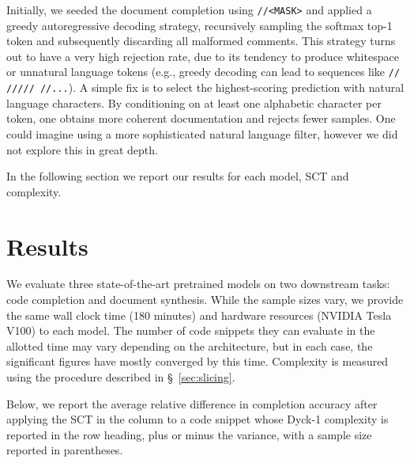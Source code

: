 \documentclass[sigconf,review,anonymous]{acmart}
\begin{document}
  Initially, we seeded the document completion using \texttt{//<MASK>} and applied a greedy autoregressive decoding strategy, recursively sampling the softmax top-1 token and subsequently discarding all malformed comments. This strategy turns out to have a very high rejection rate, due to its tendency to produce whitespace or unnatural language tokens (e.g., greedy decoding can lead to sequences like \texttt{// ///// //...}). A simple fix is to select the highest-scoring prediction with natural language characters. By conditioning on at least one alphabetic character per token, one obtains more coherent documentation and rejects fewer samples. One could imagine using a more sophisticated natural language filter, however we did not explore this in great depth.

  In the following section we report our results for each model, SCT and complexity.

  \pagebreak\section{Results}\label{sec:results}

  We evaluate three state-of-the-art pretrained models on two downstream tasks: code completion and document synthesis. While the sample sizes vary, we provide the same wall clock time (180 minutes) and hardware resources (NVIDIA Tesla V100) to each model. The number of code snippets they can evaluate in the allotted time may vary depending on the architecture, but in each case, the significant figures have mostly converged by this time. Complexity is measured using the procedure described in \S~\ref{sec:slicing}.

  Below, we report the average relative difference in completion accuracy after applying the SCT in the column to a code snippet whose Dyck-1 complexity is reported in the row heading, plus or minus the variance, with a sample size reported in parentheses.
\end{document}
